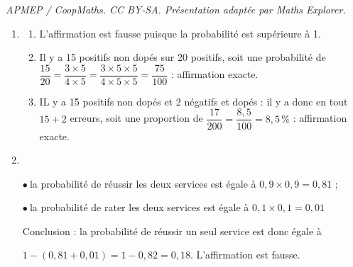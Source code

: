 \documentclass[10pt]{article}
\begin{document}
\noindent\textit{APMEP / CoopMaths. CC BY-SA. Présentation adaptée par Maths Explorer.}\par\medskip
\medskip

\begin{enumerate}
\item
	\begin{enumerate}
		\item L'affirmation est fausse puisque la probabilité est supérieure à 1.
		\item Il y a 15 positifs non dopés sur 20 positifs, soit une probabilité de $\dfrac{15}{20} = \dfrac{3 \times 5}{4 \times 5} = \dfrac{3 \times 5\times 5}{4 \times 5\times 5} = \dfrac{75}{100}$ : affirmation exacte.
		\item IL y a 15 positifs non dopés et 2 négatifs et dopés : il y a donc en tout $15 + 2$ erreurs, soit une proportion de $\dfrac{17}{200} = \dfrac{8,5}{100} = 8,5\,\%$ : affirmation exacte.
	\end{enumerate}
\item~

$\bullet~$la probabilité de réussir les deux services est égale à $0,9 \times 0,9 = 0,81$ ;

$\bullet~$la probabilité de rater les deux services est égale à $0,1 \times 0,1 = 0,01$

Conclusion : la probabilité de réussir un seul service est donc égale à 

$1 - (0,81 + 0,01) = 1 - 0,82 = 0,18$. L'affirmation est fausse.
\end{enumerate}
\end{document}
